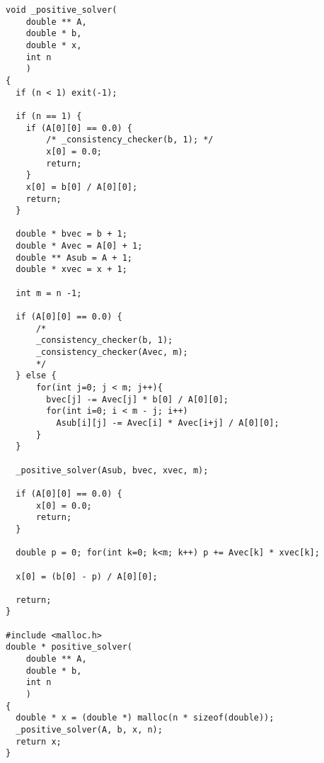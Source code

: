 \documentclass{article}
\begin{document}
\begin{verbatim}
void _positive_solver(
    double ** A, 
    double * b, 
    double * x, 
    int n
    ) 
{
  if (n < 1) exit(-1);

  if (n == 1) {
    if (A[0][0] == 0.0) {
        /* _consistency_checker(b, 1); */
        x[0] = 0.0;
        return;
    }
    x[0] = b[0] / A[0][0];
    return;
  }

  double * bvec = b + 1;
  double * Avec = A[0] + 1;
  double ** Asub = A + 1;
  double * xvec = x + 1;

  int m = n -1;

  if (A[0][0] == 0.0) {
      /*
      _consistency_checker(b, 1);
      _consistency_checker(Avec, m);
      */
  } else {
      for(int j=0; j < m; j++){
        bvec[j] -= Avec[j] * b[0] / A[0][0];
        for(int i=0; i < m - j; i++)
          Asub[i][j] -= Avec[i] * Avec[i+j] / A[0][0];
      }
  }

  _positive_solver(Asub, bvec, xvec, m);

  if (A[0][0] == 0.0) {
      x[0] = 0.0;
      return;
  }

  double p = 0; for(int k=0; k<m; k++) p += Avec[k] * xvec[k];

  x[0] = (b[0] - p) / A[0][0];

  return;
}

#include <malloc.h>
double * positive_solver(
    double ** A, 
    double * b, 
    int n
    ) 
{
  double * x = (double *) malloc(n * sizeof(double));
  _positive_solver(A, b, x, n);
  return x;
}

\end{verbatim}
\end{document}

